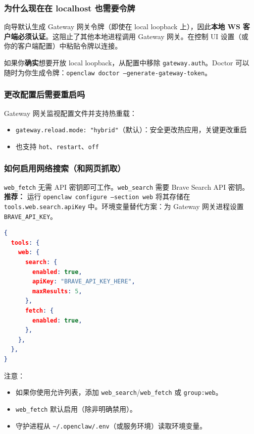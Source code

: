 \subsubsection{为什么现在在 localhost 也需要令牌}


向导默认生成 Gateway 网关令牌（即使在 local loopback 上），因此\textbf{本地 WS 客户端必须认证}。这阻止了其他本地进程调用 Gateway 网关。在控制 UI 设置（或你的客户端配置）中粘贴令牌以连接。

如果你\textbf{确实}想要开放 local loopback，从配置中移除 \texttt{gateway.auth}。Doctor 可以随时为你生成令牌：\texttt{openclaw doctor --generate-gateway-token}。

\subsubsection{更改配置后需要重启吗}


Gateway 网关监视配置文件并支持热重载：

\begin{itemize}
  \item \texttt{gateway.reload.mode: "hybrid"}（默认）：安全更改热应用，关键更改重启
  \item 也支持 \texttt{hot}、\texttt{restart}、\texttt{off}
\end{itemize}


\subsubsection{如何启用网络搜索（和网页抓取）}


\texttt{web\_fetch} 无需 API 密钥即可工作。\texttt{web\_search} 需要 Brave Search API 密钥。\textbf{推荐：} 运行 \texttt{openclaw configure --section web} 将其存储在 \texttt{tools.web.search.apiKey} 中。环境变量替代方案：为 Gateway 网关进程设置 \texttt{BRAVE\_API\_KEY}。

\begin{lstlisting}[language=json]
{
  tools: {
    web: {
      search: {
        enabled: true,
        apiKey: "BRAVE_API_KEY_HERE",
        maxResults: 5,
      },
      fetch: {
        enabled: true,
      },
    },
  },
}
\end{lstlisting}


注意：

\begin{itemize}
  \item 如果你使用允许列表，添加 \texttt{web\_search}/\texttt{web\_fetch} 或 \texttt{group:web}。
  \item \texttt{web\_fetch} 默认启用（除非明确禁用）。
  \item 守护进程从 \texttt{\textasciitilde{}/.openclaw/.env}（或服务环境）读取环境变量。
\end{itemize}



